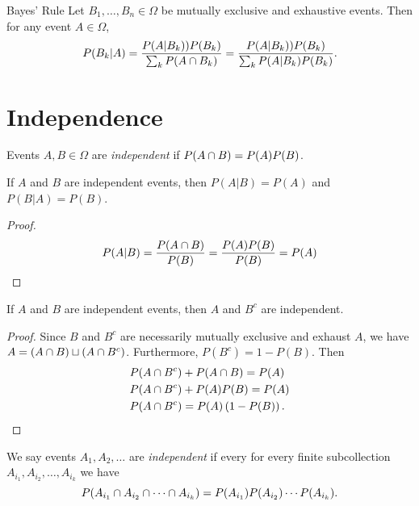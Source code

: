 \begin{thm}{Bayes' Rule}\proofbreak
    Let $B_1, \ldots, B_n \in \Omega$ be mutually exclusive and exhaustive events. Then for any event $A \in \Omega$,
    \begin{align*}
        P(B_k | A) = \frac{P(A|B_k))P(B_k)}{\sum_{k}P(A \cap B_k)} = \frac{P(A|B_k))P(B_k)}{\sum_{k}P(A | B_k)P(B_k)}.
    \end{align*}
\end{thm}

\section{Independence}

\begin{defn}
    Events $A, B \in \Omega$ are \emph{independent} if $P(A \cap B) = P(A)P(B)$.
\end{defn}

\begin{prop}
    If $A$ and $B$ are independent events, then $P(A | B) = P(A)$ and $P(B | A) = P(B)$.
\end{prop}

\begin{proof}
    \[P(A | B) = \frac{P(A \cap B)}{P(B)} = \frac{P(A)P(B)}{P(B)} = P(A)\]
\end{proof}

\begin{prop}
    If $A$ and $B$ are independent events, then $A$ and $B^{c}$ are independent.
\end{prop}

\begin{proof} Since $B$ and $B^{c}$ are necessarily mutually exclusive and exhaust $A$, we have $A = (A \cap B) \sqcup (A \cap B^{c})$. Furthermore, $P(B^{c}) = 1- P(B)$. Then
    \begin{align}
        P(A \cap B^{c}) &+ P(A \cap B) = P(A) \\
        P(A \cap B^{c}) &+ P(A)P(B) = P(A) \\
        P(A \cap B^{c}) &= P(A)\left(1 - P(B)\right).
    \end{align}
\end{proof}

\begin{defn}
    We say events $A_1, A_2, \ldots$ are \emph{independent} if every for every finite subcollection $A_{i_1}, A_{i_2}, \ldots, A_{i_k}$ we have
    \[P(A_{i_1} \cap A_{i_2} \cap \cdots \cap A_{i_k}) = P(A_{i_1})P(A_{i_2})\cdots P(A_{i_k}).\]
\end{defn}

